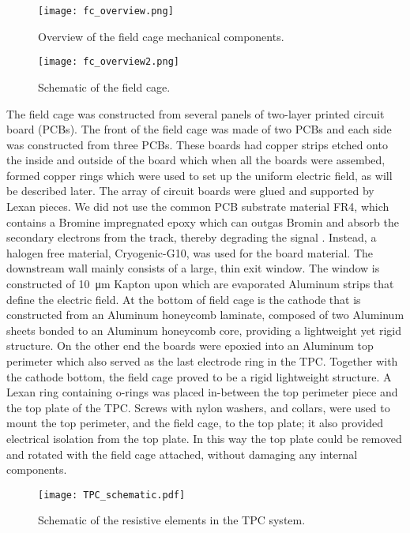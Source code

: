 \begin{figure}[!htb]
\centering
\texttt{[image: fc\_overview.png]}
\label{fig:fc_overview}
\caption{Overview of the field cage mechanical components.}
\end{figure}


\begin{figure}[!htb]
\texttt{[image: fc\_overview2.png]}
\label{fig:fc_overview2}
\caption{Schematic of the field cage.}
\end{figure}


The field cage was constructed from several panels of two-layer printed circuit board (PCBs). The front of the field cage was made of two PCBs and each side was constructed from three PCBs. These boards had copper strips etched onto the inside and outside of the board which when all the boards were assembed, formed copper rings which were used to set up the uniform electric field, as will be described later. The array of circuit boards were glued and supported by Lexan pieces. We did not use the common PCB substrate material FR4, which contains a Bromine impregnated epoxy which can outgas Bromin and absorb the secondary electrons from the track, thereby degrading the signal \cite{tpcAging}. Instead, a halogen free material, Cryogenic-G10, was used for the board material.  The downstream wall mainly consists of a large, thin exit window. The window  is constructed of   \SI{10}{\micro\metre} Kapton upon which are  evaporated Aluminum strips that define the electric field. At the bottom of field cage is the cathode that is  constructed from an Aluminum honeycomb laminate, composed of two Aluminum sheets bonded to an Aluminum honeycomb core, providing a lightweight yet rigid structure. On the other end the boards were epoxied into an Aluminum top perimeter which also served as the last electrode ring in the TPC. Together with the cathode bottom, the field cage proved to be a rigid lightweight structure. A Lexan ring containing o-rings was placed in-between the top perimeter piece and the top plate of the TPC. Screws with nylon washers, and collars, were used to mount the top perimeter, and the field cage, to the top plate; it also provided electrical isolation from the top plate. In this way the top plate could be removed and rotated with the field cage attached, without damaging any internal components. 

\begin{figure}[!htb]
\centering
\texttt{[image: TPC\_schematic.pdf]}
\caption{Schematic of the resistive elements in the TPC system.}
\label{fig:TPC_schematic}
\end{figure}



